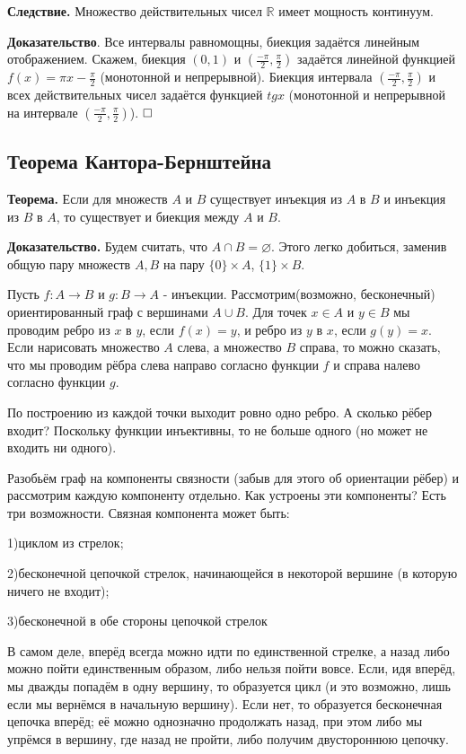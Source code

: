 \documentclass[a4paper, 10pt]{article}
\begin{document}
\textbf{Следствие.} Множество действительных чисел $\mathbb{R}$ имеет мощность континуум.


\medspace

\textbf{Доказательство}. Все интервалы равномощны, биекция задаётся линейным отображением. Скажем, биекция $(0, 1)$ и $(\frac{-\pi}{2}, \frac{\pi}{2})$ задаётся линейной функцией $f(x) = \pi x - \frac{\pi}{2}$ (монотонной и непрерывной).
Биекция интервала $(\frac{-\pi}{2}, \frac{\pi}{2})$ и всех действительных чисел задаётся функцией $tg x$ (монотонной и непрерывной на интервале $(\frac{-\pi}{2}, \frac{\pi}{2})$). $\hfill \square$


\subsection{Теорема Кантора-Бернштейна}

\textbf{Теорема.} Если для множеств $A$ и $B$ существует инъекция из $A$ в $B$ и инъекция из $B$ в $A$, то существует и биекция между $A$ и $B$.

\textbf{Доказательство.} Будем считать, что $A \cap B = \varnothing$. Этого легко добиться, заменив общую пару множеств $A, B$ на пару $\{0\} \times A$, $\{1\} \times B$.

Пусть $f: A \to B$ и $g: B \to A$ - инъекции. Рассмотрим(возможно, бесконечный) ориентированный граф с вершинами $A \cup B$. Для точек $x \in A$ и $y \in B$ мы проводим ребро из $x$ в $y$, если $f(x) = y$, и ребро из $y$ в $x$, если $g(y) = x$. Если нарисовать множество $A$ слева, а множество $B$ справа, то можно сказать, что мы проводим рёбра слева направо согласно функции $f$ и справа налево согласно функции $g$.

По построению из каждой точки выходит ровно одно ребро. А сколько рёбер входит? Поскольку функции инъективны, то не больше одного (но может не входить ни одного).

Разобьём граф на компоненты связности (забыв для этого об ориентации рёбер) и рассмотрим каждую компоненту отдельно. Как устроены эти компоненты? Есть три возможности. Связная компонента может быть:

1)циклом из стрелок;

2)бесконечной цепочкой стрелок, начинающейся в некоторой вершине (в которую ничего не входит);

3)бесконечной в обе стороны цепочкой стрелок 


\medspace

В самом деле, вперёд всегда можно идти по единственной стрелке, а назад либо можно пойти единственным образом, либо нельзя пойти вовсе. Если, идя вперёд, мы дважды попадём в одну вершину, то образуется цикл (и это возможно, лишь если мы вернёмся в начальную вершину). Если нет, то образуется бесконечная цепочка вперёд; её можно однозначно продолжать назад, при этом либо мы упрёмся в вершину, где назад не пройти, либо получим двустороннюю цепочку.
\end{document}

